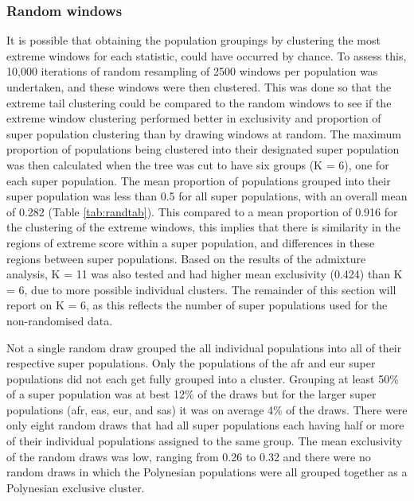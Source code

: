 \documentclass[]{report}
\begin{document}
\subsubsection{Random windows}\label{random-windows}

It is possible that obtaining the population groupings by clustering the
most extreme windows for each statistic, could have occurred by chance.
To assess this, 10,000 iterations of random resampling of 2500 windows
per population was undertaken, and these windows were then clustered.
This was done so that the extreme tail clustering could be compared to
the random windows to see if the extreme window clustering performed
better in exclusivity and proportion of super population clustering than
by drawing windows at random. The maximum proportion of populations
being clustered into their designated super population was then
calculated when the tree was cut to have six groups (K = 6), one for
each super population. The mean proportion of populations grouped into
their super population was less than 0.5 for all super populations, with
an overall mean of 0.282 (Table \ref{tab:randtab}). This compared to a
mean proportion of 0.916 for the clustering of the extreme windows, this
implies that there is similarity in the regions of extreme score within
a super population, and differences in these regions between super
populations. Based on the results of the admixture analysis, K = 11 was
also tested and had higher mean exclusivity (0.424) than K = 6, due to
more possible individual clusters. The remainder of this section will
report on K = 6, as this reflects the number of super populations used
for the non-randomised data.

Not a single random draw grouped the all individual populations into all
of their respective super populations. Only the populations of the
\gls{afr} and \gls{eur} super populations did not each get fully grouped
into a cluster. Grouping at least 50\% of a super population was at best
12\% of the draws but for the larger super populations (\gls{afr},
\gls{eas}, \gls{eur}, and \gls{sas}) it was on average 4\% of the draws.
There were only eight random draws that had all super populations each
having half or more of their individual populations assigned to the same
group. The mean exclusivity of the random draws was low, ranging from
0.26 to 0.32 and there were no random draws in which the Polynesian
populations were all grouped together as a Polynesian exclusive cluster.
\end{document}

